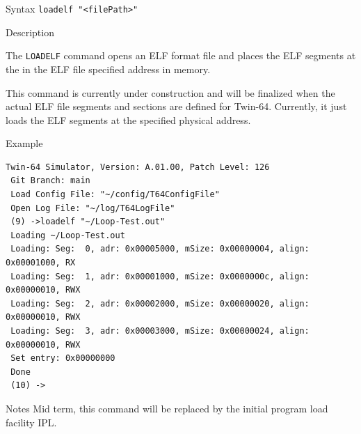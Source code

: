 %
%
\pagebreak
{}

\begin{iPageDescEntry}{Syntax}
\texttt{loadelf "<filePath>" } \\
\end{iPageDescEntry}

\begin{iPageDescEntry}{Description}

The \texttt{LOADELF} command opens an ELF format file and places the ELF segments at the in the ELF file specified address in memory. 

This command is currently under construction and will be finalized when the actual ELF file segments and sections are defined for Twin-64. Currently, it just loads the ELF segments at the specified physical address.

\end{iPageDescEntry}

\begin{iPageDescOpEntry}{Example}
\begin{lstlisting}[style=iPageOpStyle]
Twin-64 Simulator, Version: A.01.00, Patch Level: 126
 Git Branch: main
 Load Config File: "~/config/T64ConfigFile"
 Open Log File: "~/log/T64LogFile"
 (9) ->loadelf "~/Loop-Test.out"
 Loading ~/Loop-Test.out
 Loading: Seg:  0, adr: 0x00005000, mSize: 0x00000004, align: 0x00001000, RX
 Loading: Seg:  1, adr: 0x00001000, mSize: 0x0000000c, align: 0x00000010, RWX
 Loading: Seg:  2, adr: 0x00002000, mSize: 0x00000020, align: 0x00000010, RWX
 Loading: Seg:  3, adr: 0x00003000, mSize: 0x00000024, align: 0x00000010, RWX
 Set entry: 0x00000000
 Done
 (10) ->

\end{lstlisting}
\end{iPageDescOpEntry}

\begin{iPageDescEntry}{Notes}
Mid term, this command will be replaced by the initial program load facility IPL.
\end{iPageDescEntry}

